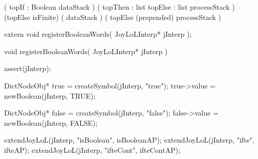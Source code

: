 \preDataStack
  (
    topIf : Boolean
    dataStack
  )
\preProcessStack
  (
    topThen : list
    topElse : list
    processStack
  )
\preConditions
  (topElse isFinite)
\postDataStack
  (
    dataStack
  )
\postProcessStack
  (
    topElse (prepended)
    processStack
  )
\postConditions
\stopRule

\stopJoyLoLWord

\startCHeader
extern void registerBooleanWords(
  JoyLoLInterp* jInterp
);
\stopCHeader
{}

\startCCode
void registerBooleanWords(
  JoyLoLInterp* jInterp
) {
  assert(jInterp);

  DictNodeObj* true  = createSymbol(jInterp, "true");
  true->value    = newBoolean(jInterp, TRUE);

  DictNodeObj* false = createSymbol(jInterp, "false");
  false->value   = newBoolean(jInterp, FALSE);

  extendJoyLoL(jInterp, "isBoolean", isBooleanAP);
  extendJoyLoL(jInterp, "ifte",      ifteAP);
  extendJoyLoL(jInterp, "ifteCont",  ifteContAP);
}
\stopCCode
